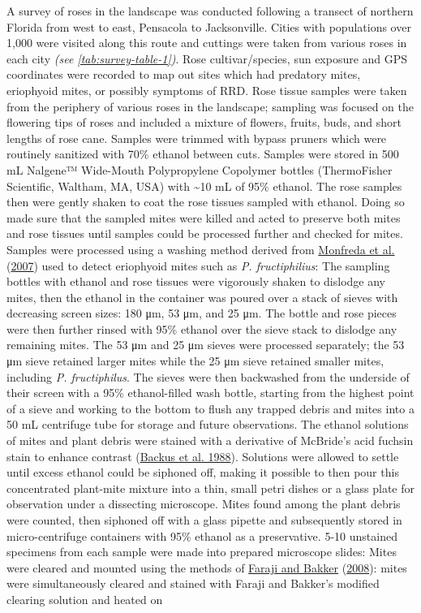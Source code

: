 \documentclass[12pt,final,CPage]{ufthesis}
\begin{document}
{  A survey of roses in the landscape was conducted following a transect of northern Florida from west to east, Pensacola to Jacksonville. Cities with populations over 1,000 were visited along this route and cuttings were taken from various roses in each city \emph{(see \ref{tab:survey-table-1})}. Rose cultivar/species, sun exposure and GPS coordinates were recorded to map out sites which had predatory mites, eriophyoid mites, or possibly symptoms of RRD. Rose tissue samples were taken from the periphery of various roses in the landscape; sampling was focused on the flowering tips of roses and included a mixture of flowers, fruits, buds, and short lengths of rose cane. Samples were trimmed with bypass pruners which were routinely sanitized with 70\% ethanol between cuts. Samples were stored in 500 \si{\milli\liter} Nalgene™ Wide-Mouth Polypropylene Copolymer bottles (ThermoFisher Scientific, Waltham, MA, USA) with \textasciitilde10 \si{\milli\liter} of 95\% ethanol. The rose samples then were gently shaken to coat the rose tissues sampled with ethanol. Doing so made sure that the sampled mites were killed and acted to preserve both mites and rose tissues until samples could be processed further and checked for mites. Samples were processed using a washing method derived from \protect\hyperlink{ref-Monfreda2007}{Monfreda et al.} (\protect\hyperlink{ref-Monfreda2007}{2007}) used to detect eriophyoid mites such as \emph{P. fructiphilius}: The sampling bottles with ethanol and rose tissues were vigorously shaken to dislodge any mites, then the ethanol in the container was poured over a stack of sieves with decreasing screen sizes: 180 \si{\micro\metre}, 53 \si{\micro\metre}, and 25 \si{\micro\metre}. The bottle and rose pieces were then further rinsed with 95\% ethanol over the sieve stack to dislodge any remaining mites. The 53 \si{\micro\metre} and 25 \si{\micro\metre} sieves were processed separately; the 53 \si{\micro\metre} sieve retained larger mites while the 25 \si{\micro\metre} sieve retained smaller mites, including \emph{P. fructiphilus}. The sieves were then backwashed from the underside of their screen with a 95\% ethanol-filled wash bottle, starting from the highest point of a sieve and working to the bottom to flush any trapped debris and mites into a 50 \si{\milli\liter} centrifuge tube for storage and future observations. The ethanol solutions of mites and plant debris were stained with a derivative of McBride's acid fuchsin stain to enhance contrast (\protect\hyperlink{ref-Backus1988}{Backus et al. 1988}). Solutions were allowed to settle until excess ethanol could be siphoned off, making it possible to then pour this concentrated plant-mite mixture into a thin, small petri dishes or a glass plate for observation under a dissecting microscope. Mites found among the plant debris were counted, then siphoned off with a glass pipette and subsequently stored in micro-centrifuge containers with 95\% ethanol as a preservative. 5-10 unstained specimens from each sample were made into prepared microscope slides: Mites were cleared and mounted using the methods of \protect\hyperlink{ref-Faraji2008}{Faraji and Bakker} (\protect\hyperlink{ref-Faraji2008}{2008}): mites were simultaneously cleared and stained with Faraji and Bakker's modified clearing solution and heated on }
\end{document}
